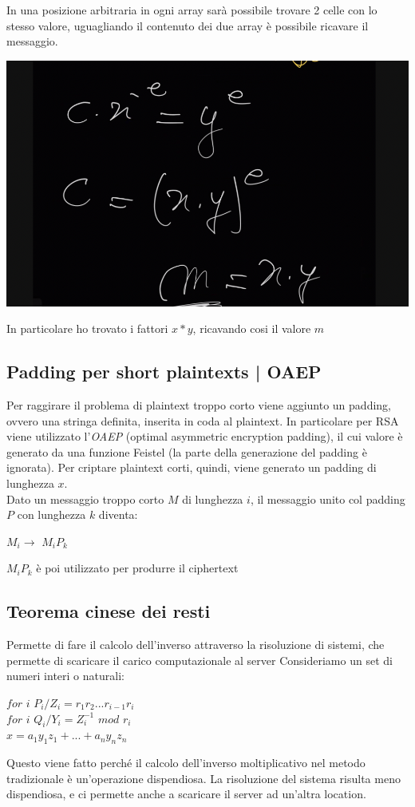 \documentclass[11pt, oneside]{article}   	%
\begin{document}
In una posizione arbitraria in ogni array sarà possibile trovare 2 celle con lo stesso valore, uguagliando il contenuto dei due array è possibile ricavare il messaggio.
\begin{center}
\includegraphics[scale= 0.7]{m2}
\end{center}
In particolare ho trovato i fattori $x * y$, ricavando cosi il valore $m$
\subsection*{Padding per short plaintexts | OAEP}
Per raggirare il problema di plaintext troppo corto viene aggiunto un padding, ovvero una stringa definita, inserita in coda al plaintext. In particolare per RSA viene utilizzato l'\emph{OAEP} (optimal asymmetric encryption padding), il cui valore è generato da una funzione Feistel (la parte della generazione del padding è ignorata). Per criptare plaintext corti, quindi, viene generato un padding di lunghezza $x$.\\
Dato un messaggio troppo corto $M$ di lunghezza $i$, il messaggio unito col padding $P$ con lunghezza $k$ diventa:	\begin{center}
$M_i \rightarrow$ $M_iP_k$

\end{center}
$M_iP_k$ è poi utilizzato per produrre il ciphertext


\subsection*{Teorema cinese dei resti}
Permette di fare il calcolo dell'inverso attraverso la risoluzione di sistemi, che permette di scaricare il carico computazionale al server
Consideriamo un set di numeri interi o naturali:
\begin{center}
$for$ $i$ 	$P_i/Z_i = r_1r_2...r_{i-1}r_{i}$\\
$for$ $i$ 	$Q_i/Y_i = Z^{-1}_i$ $mod$ $r_i$\\
$x = a_1y_1z_1+ ... + a_ny_nz_n$\\
\end{center}
Questo viene fatto perché il calcolo dell'inverso moltiplicativo nel metodo tradizionale è un'operazione dispendiosa. La risoluzione del sistema risulta meno dispendiosa, e ci permette anche a scaricare il server ad un'altra location.
\end{document}
